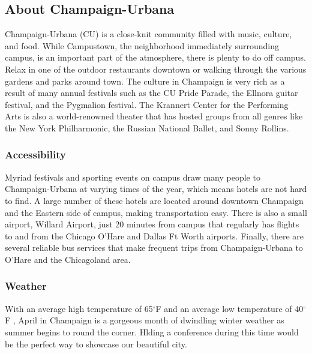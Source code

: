 \documentclass[12pt, letterpaper]{article}
\begin{document}
\subsection{About Champaign-Urbana}
Champaign-Urbana (CU) is a close-knit community filled with music, culture, and food. While Campustown, the neighborhood immediately surrounding campus,  is an important part of the atmosphere, there is plenty to do off campus. Relax in one of the outdoor restaurants downtown or walking through the various gardens and parks around town. The culture in Champaign is very rich as a result of many annual festivals such as the CU Pride Parade, the Ellnora guitar festival, and the Pygmalion festival. The Krannert Center for the Performing Arts is also a world-renowned theater that has hosted groups from all genres like the New York Philharmonic, the Russian National Ballet, and Sonny Rollins.

\subsubsection{Accessibility}
Myriad festivals and sporting events on campus draw many people to Champaign-Urbana at varying times of the year, which means hotels are not hard to find. A large number of these hotels are located around downtown Champaign and the Eastern side of campus, making transportation easy. There is also a small airport, Willard Airport, just 20 minutes from campus that regularly has flights to and from the Chicago O’Hare and Dallas Ft Worth airports. Finally, there are several reliable bus services that make frequent trips from Champaign-Urbana to O’Hare and the Chicagoland area.

\subsubsection{Weather}
With an average high temperature of 65$^\circ$F and an average low temperature of 40$^\circ$F , April in Champaign is a gorgeous month of dwindling winter weather as summer begins to round the corner. Hlding a conference during this time would be the perfect way to showcase our beautiful city.
\end{document}
